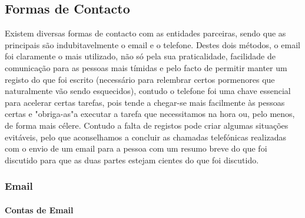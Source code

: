 \subsection{Formas de Contacto}

Existem diversas formas de contacto com as entidades parceiras, sendo que as principais são indubitavelmente o email e o telefone. Destes dois métodos, o email foi claramente o mais utilizado, não só pela sua praticalidade, facilidade de comunicação para as pessoas mais tímidas e pelo facto de permitir manter um registo do que foi escrito (necessário para relembrar certos pormenores que naturalmente vão sendo esquecidos), contudo o telefone foi uma chave essencial para acelerar certas tarefas, pois tende a chegar-se mais facilmente às pessoas certas e "obriga-as"\space a executar a tarefa que necessitamos na hora ou, pelo menos, de forma mais célere. Contudo a falta de registos pode criar algumas situações evitáveis, pelo que aconselhamos a concluir as chamadas telefónicas realizadas com o envio de um email para a pessoa com um resumo breve do que foi discutido para que as duas partes estejam cientes do que foi discutido.

\subsubsection{Email}

\paragraph{Contas de Email}

